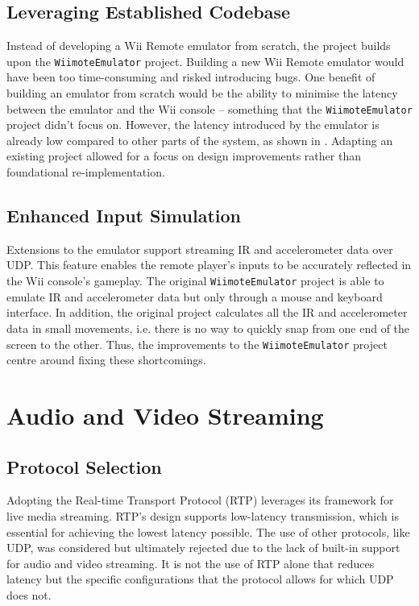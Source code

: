 \subsection{Leveraging Established Codebase}
Instead of developing a Wii Remote emulator from scratch, the project builds
upon the \texttt{WiimoteEmulator} project. Building a new Wii Remote emulator
would have been too time-consuming and risked introducing bugs. One benefit of
building an emulator from scratch would be the ability to minimise the latency
between the emulator and the Wii console -- something that the
\texttt{WiimoteEmulator} project didn't focus on. However, the latency
introduced by the emulator is already low compared to other parts of the system, as shown in . Adapting an existing project allowed
for a focus on design improvements rather than foundational re-implementation.

\subsection{Enhanced Input Simulation}
Extensions to the emulator support streaming IR and accelerometer data over UDP. This feature enables the remote player’s inputs to be accurately reflected in the Wii console’s gameplay. The original \texttt{WiimoteEmulator} project is able to emulate IR and accelerometer data but only through a mouse and keyboard interface. In addition, the original project calculates all the IR and accelerometer data in small movements, i.e. there is no way to quickly snap from one end of the screen to the other. Thus, the improvements to the \texttt{WiimoteEmulator} project centre around fixing these shortcomings.

\section{Audio and Video Streaming}

\subsection{Protocol Selection}
Adopting the Real-time Transport Protocol (RTP) leverages its framework for live
media streaming. RTP’s design supports low-latency transmission, which is
essential for achieving the lowest latency possible. The use of other protocols, like
UDP, was considered but ultimately rejected due to the lack of built-in support for
audio and video streaming. It is not the use of RTP alone that reduces latency but the
specific configurations that the protocol allows for which UDP does not.

